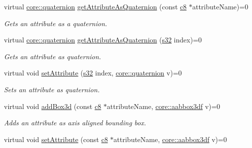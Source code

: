 \begin{DoxyCompactItemize}
virtual \hyperlink{classirr_1_1core_1_1quaternion}{core\+::quaternion} \hyperlink{classirr_1_1io_1_1IAttributes_a59248466d3f3ea2d7930876e577b222d}{get\+Attribute\+As\+Quaternion} (const \hyperlink{namespaceirr_a9395eaea339bcb546b319e9c96bf7410}{c8} $\ast$attribute\+Name)=0
\begin{DoxyCompactList}\small\item\em Gets an attribute as a quaternion. \end{DoxyCompactList}\item 
virtual \hyperlink{classirr_1_1core_1_1quaternion}{core\+::quaternion} \hyperlink{classirr_1_1io_1_1IAttributes_aee7cc16cae259af9cbdd37bfc9956a5f}{get\+Attribute\+As\+Quaternion} (\hyperlink{namespaceirr_ac66849b7a6ed16e30ebede579f9b47c6}{s32} index)=0
\begin{DoxyCompactList}\small\item\em Gets an attribute as quaternion. \end{DoxyCompactList}\item 
\mbox{\label{classirr_1_1io_1_1IAttributes_ac727ca222d4604f04742f391c9e18008}} 
virtual void \hyperlink{classirr_1_1io_1_1IAttributes_ac727ca222d4604f04742f391c9e18008}{set\+Attribute} (\hyperlink{namespaceirr_ac66849b7a6ed16e30ebede579f9b47c6}{s32} index, \hyperlink{classirr_1_1core_1_1quaternion}{core\+::quaternion} v)=0
\begin{DoxyCompactList}\small\item\em Sets an attribute as quaternion. \end{DoxyCompactList}\item 
\mbox{\label{classirr_1_1io_1_1IAttributes_adb9f747bf01137075e8e30f0d75cb56c}} 
virtual void \hyperlink{classirr_1_1io_1_1IAttributes_adb9f747bf01137075e8e30f0d75cb56c}{add\+Box3d} (const \hyperlink{namespaceirr_a9395eaea339bcb546b319e9c96bf7410}{c8} $\ast$attribute\+Name, \hyperlink{namespaceirr_1_1core_adfc8fa01b30044c55f3332a1d6c1aa19}{core\+::aabbox3df} v)=0
\begin{DoxyCompactList}\small\item\em Adds an attribute as axis aligned bounding box. \end{DoxyCompactList}\item 
\mbox{\label{classirr_1_1io_1_1IAttributes_a1b876bafce99d3401c2157c0a01dd9f6}} 
virtual void \hyperlink{classirr_1_1io_1_1IAttributes_a1b876bafce99d3401c2157c0a01dd9f6}{set\+Attribute} (const \hyperlink{namespaceirr_a9395eaea339bcb546b319e9c96bf7410}{c8} $\ast$attribute\+Name, \hyperlink{namespaceirr_1_1core_adfc8fa01b30044c55f3332a1d6c1aa19}{core\+::aabbox3df} v)=0

\end{DoxyCompactItemize}
